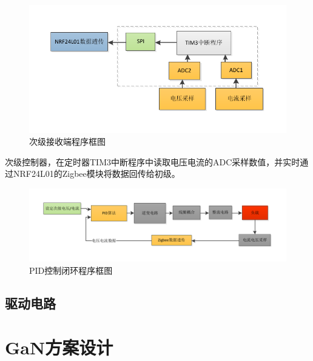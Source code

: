 ﻿\documentclass[UTF-8,a4paper,12pt]{ctexart}
\begin{document}
            \begin{figure}[H]
              \centering
              \includegraphics[width=15cm]{sub.pdf}
              \caption{次级接收端程序框图}
              \label{frame_prim}
            \end{figure}
                次级控制器，在定时器TIM3中断程序中读取电压电流的ADC采样数值，并实时通过NRF24L01的Zigbee模块将数据回传给初级。
            \begin{figure}[H]
              \centering
              \includegraphics[width=15cm]{control.pdf}
              \caption{PID控制闭环程序框图}
              \label{control}
            \end{figure}
    \subsection{驱动电路}


\section{GaN方案设计}
\end{document}
